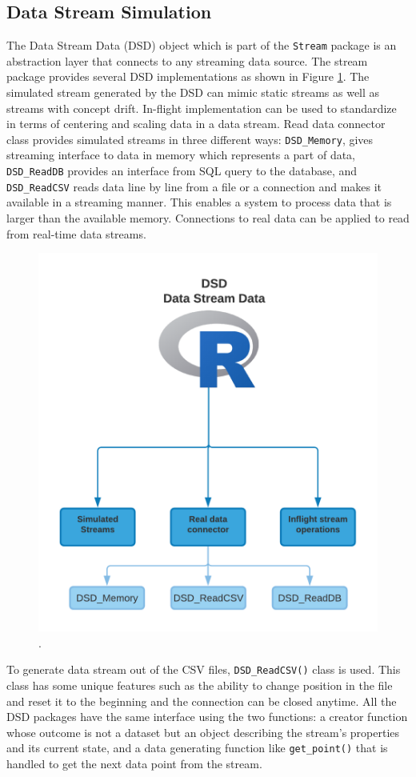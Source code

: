 \documentclass[../UNBThesis2.tex]{subfiles}
\begin{document}
\subsection{Data Stream Simulation}
The Data Stream Data (DSD) object which is part of the \texttt{Stream} package is an abstraction layer that connects to any streaming data source. The stream package provides several DSD implementations as shown in Figure \ref{dsd}. The simulated stream generated by the DSD can mimic static streams as well as streams with concept drift. In-flight implementation can be used to standardize in terms of centering and scaling data in a data stream. %
Read data connector class provides simulated streams in three different ways: \texttt{DSD\_Memory}, gives streaming interface to data in memory which represents a part of data, \texttt{DSD\_ReadDB} provides an interface from SQL query to the database, and \texttt{DSD\_ReadCSV} reads data line by line from a file or a connection and makes it available in a streaming manner. This enables a system to process data that is larger than the available memory. Connections to real data can be applied to read from real-time data streams.

\begin{figure}[!htb]
    \centering
    \includegraphics[width = 8 cm]{image/Chapters/Chapter5/dsd.png}
    \caption{ .}
    \label{dsd}
\end{figure}


To generate data stream out of the CSV files, \texttt{DSD\_ReadCSV()} class is used. This class has some unique features such as the ability to change position in the file and reset it to the beginning and the connection can be closed anytime. All the DSD packages have the same interface using the two functions: a creator function whose outcome is not a dataset but an object describing the stream's properties and its current state, and a data generating function like \texttt{get\_point()} that is handled to get the next data point from the stream.
\end{document}
